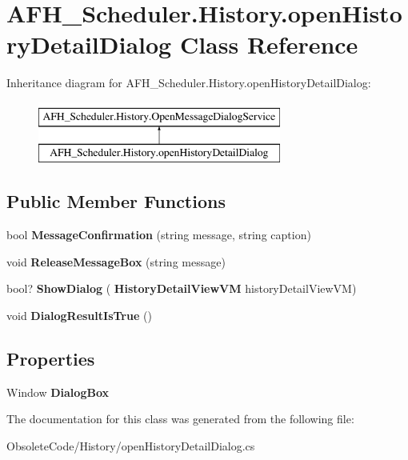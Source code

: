 \section{A\+F\+H\+\_\+\+Scheduler.\+History.\+open\+History\+Detail\+Dialog Class Reference}
\label{class_a_f_h___scheduler_1_1_history_1_1open_history_detail_dialog}
Inheritance diagram for A\+F\+H\+\_\+\+Scheduler.\+History.\+open\+History\+Detail\+Dialog\+:\begin{figure}[H]
\begin{center}
\leavevmode
\includegraphics[height=2.000000cm]{class_a_f_h___scheduler_1_1_history_1_1open_history_detail_dialog}
\end{center}
\end{figure}
\subsection*{Public Member Functions}
\begin{DoxyCompactItemize}
\item 
\mbox{\label{class_a_f_h___scheduler_1_1_history_1_1open_history_detail_dialog_ad5adaf07fb1d342f460c56cf0a88f2eb}} 
bool {\bfseries Message\+Confirmation} (string message, string caption)
\item 
\mbox{\label{class_a_f_h___scheduler_1_1_history_1_1open_history_detail_dialog_a0ce1b70cbc00fc4a2048e62327a5c708}} 
void {\bfseries Release\+Message\+Box} (string message)
\item 
\mbox{\label{class_a_f_h___scheduler_1_1_history_1_1open_history_detail_dialog_a077e2dfa6b9626f14b728c50b917d78d}} 
bool? {\bfseries Show\+Dialog} (\textbf{ History\+Detail\+View\+VM} history\+Detail\+View\+VM)
\item 
\mbox{\label{class_a_f_h___scheduler_1_1_history_1_1open_history_detail_dialog_ab4509fd58d2c888f5663a7db47ae94a6}} 
void {\bfseries Dialog\+Result\+Is\+True} ()
\end{DoxyCompactItemize}
\subsection*{Properties}
\begin{DoxyCompactItemize}
\item 
\mbox{\label{class_a_f_h___scheduler_1_1_history_1_1open_history_detail_dialog_a0c60eb2cf4cedad5ad13103b31788236}} 
Window {\bfseries Dialog\+Box}\hspace{0.3cm}{\ttfamily  [get, set]}
\end{DoxyCompactItemize}


The documentation for this class was generated from the following file\+:\begin{DoxyCompactItemize}
\item 
Obsolete\+Code/\+History/open\+History\+Detail\+Dialog.\+cs\end{DoxyCompactItemize}
